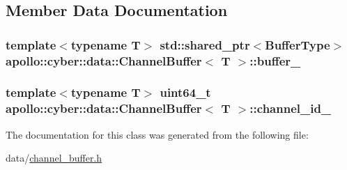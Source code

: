 \subsection{Member Data Documentation}
\hypertarget{classapollo_1_1cyber_1_1data_1_1ChannelBuffer_a5db350f9adda047d243e1ea696b13ccc}{
\subsubsection[{buffer\-\_\-}]{\setlength{\rightskip}{0pt plus 5cm}template$<$typename T$>$ std\-::shared\-\_\-ptr$<${\bf Buffer\-Type}$>$ {\bf apollo\-::cyber\-::data\-::\-Channel\-Buffer}$<$ T $>$\-::buffer\-\_\-\hspace{0.3cm}{\ttfamily [private]}}}\label{classapollo_1_1cyber_1_1data_1_1ChannelBuffer_a5db350f9adda047d243e1ea696b13ccc}
\hypertarget{classapollo_1_1cyber_1_1data_1_1ChannelBuffer_a019c648fb3ffbc85bd2639878b70e120}{
\subsubsection[{channel\-\_\-id\-\_\-}]{\setlength{\rightskip}{0pt plus 5cm}template$<$typename T$>$ uint64\-\_\-t {\bf apollo\-::cyber\-::data\-::\-Channel\-Buffer}$<$ T $>$\-::channel\-\_\-id\-\_\-\hspace{0.3cm}{\ttfamily [private]}}}\label{classapollo_1_1cyber_1_1data_1_1ChannelBuffer_a019c648fb3ffbc85bd2639878b70e120}


The documentation for this class was generated from the following file\-:\begin{DoxyCompactItemize}
\item 
data/\hyperlink{channel__buffer_8h}{channel\-\_\-buffer.\-h}\end{DoxyCompactItemize}
